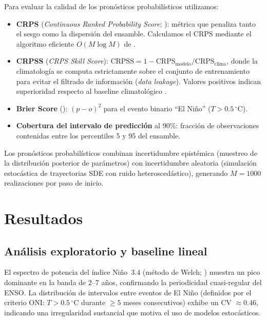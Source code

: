 \documentclass[11pt,a4paper]{article}
\begin{document}
Para evaluar la calidad de los pronósticos probabilísticos utilizamos:
\begin{itemize}
  \item \textbf{CRPS} (\textit{Continuous Ranked Probability Score}; \citealt{hersbach2000}): métrica que penaliza tanto el sesgo como la dispersión del ensamble. Calculamos el CRPS mediante el algoritmo eficiente $O(M \log M)$ de \citet{jordan2019}.
  \item \textbf{CRPSS} (\textit{CRPS Skill Score}): $\mathrm{CRPSS} = 1 - \mathrm{CRPS}_{\text{modelo}} / \mathrm{CRPS}_{\text{clima}}$, donde la climatología se computa estrictamente sobre el conjunto de entrenamiento para evitar el filtrado de información (\textit{data leakage}). Valores positivos indican superioridad respecto al baseline climatológico \citep{gneiting2007}.
  \item \textbf{Brier Score} (\citealt{brier1950}): $(p - o)^2$ para el evento binario ``El Niño'' ($T > 0.5\,^{\circ}\mathrm{C}$).
  \item \textbf{Cobertura del intervalo de predicción} al 90\%: fracción de observaciones contenidas entre los percentiles 5 y 95 del ensamble.
\end{itemize}

Los pronósticos probabilísticos combinan incertidumbre epistémica (muestreo de la distribución posterior de parámetros) con incertidumbre aleatoria (simulación estocástica de trayectorias SDE con ruido heteroscedástico), generando $M = 1000$ realizaciones por paso de inicio.






\section{Resultados}
\label{sec:resultados}

\subsection{Análisis exploratorio y baseline lineal}

El espectro de potencia del índice Niño~3.4 (método de Welch; \citealt{welch1967}) muestra un pico dominante en la banda de 2--7 años, confirmando la periodicidad cuasi-regular del ENSO. La distribución de intervalos entre eventos de El Niño (definidos por el criterio ONI: $T > 0.5\,^{\circ}\mathrm{C}$ durante $\geq 5$ meses consecutivos) exhibe un CV $\approx 0.46$, indicando una irregularidad sustancial que motiva el uso de modelos estocásticos.
\end{document}
